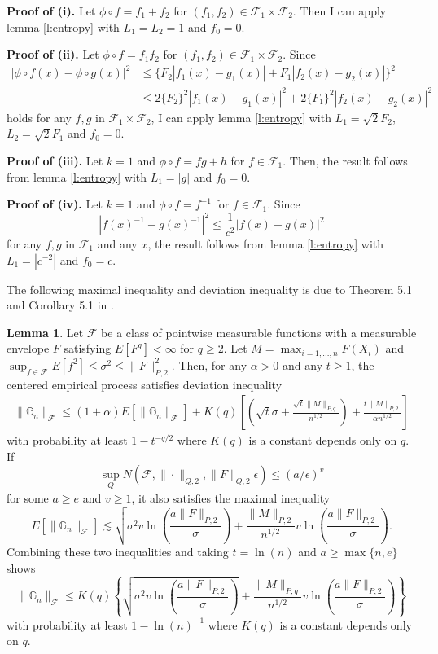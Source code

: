\documentclass[12pt,oneside,reqno,english]{amsart}
\theoremstyle{definition}
\newtheorem{lemma}{Lemma}
\begin{document}
\textbf{Proof of (i).} 
Let $\phi\circ f=f_{1}+f_{2}$ for $(f_{1},f_{2})\in \mathcal{F}_{1}\times \mathcal{F}_{2}$. 
Then I can apply lemma \ref{l:entropy} with $L_{1}=L_{2}=1$ and $f_{0}=0$. 

\textbf{Proof of (ii).} 
Let $\phi\circ f=f_{1}f_{2}$ for $(f_{1},f_{2})\in \mathcal{F}_{1}\times \mathcal{F}_{2}$. Since  
\begin{align*}
|\phi\circ f(x)-\phi\circ g(x)|^{2}&\leq \{F_{2}|f_{1}(x)-g_{1}(x)|+F_{1}|f_{2}(x)-g_{2}(x)|\}^{2}\\ 
&\leq 2\{F_{2}\}^{2}|f_{1}(x)-g_{1}(x)|^{2}+2\{F_{1}\}^{2}|f_{2}(x)-g_{2}(x)|^{2}
\end{align*}
holds for any $f, g$ in $\mathcal{F}_{1}\times \mathcal{F}_{2}$, I can apply 
lemma \ref{l:entropy} with $L_{1}=\sqrt{2}F_{2}$, $L_{2}=\sqrt{2}F_{1}$ and $f_{0}=0$. 

\textbf{Proof of (iii).} 
Let $k=1$ and $\phi\circ f= fg+h$ for $f\in \mathcal{F}_{1}$. Then, the result follows from 
lemma \ref{l:entropy} with $L_{1}=|g|$ and $f_{0}=0$.  

\textbf{Proof of (iv).} 
Let $k=1$ and $\phi\circ f= f^{-1}$ for $f\in \mathcal{F}_{1}$.
Since 
\[|f(x)^{-1}-g(x)^{-1}|^{2}\leq \frac{1}{c^{2}}|f(x)-g(x)|^{2}\]
for any $f, g$ in $\mathcal{F}_{1}$ and any $x$, 
the result follows from lemma \ref{l:entropy} with $L_{1}=|c^{-2}|$ and $f_{0}=c$.  


The following maximal inequality and deviation inequality is due to Theorem 5.1 and Corollary 5.1 in \cite{CCK:14}. 
\begin{lemma}\label{l:deviation}
Let $\mathcal{F}$ be a class of pointwise measurable functions with a measurable envelope $F$ satisfying $E[F^{q}]<\infty$ for $q\geq 2$. 
Let $M=\max_{i=1,...,n}F(X_{i})$ and $\sup_{f\in \mathcal{F}}E[f^{2}]\leq \sigma^{2}\leq \|F\|_{P,2}^{2}$. 
Then, for any $\alpha>0$ and any $t\geq 1$,
 the centered empirical process satisfies deviation inequality 
\begin{align*}
\|\mathbb{G}_{n}\|_{\mathcal{F}}\leq (1+\alpha)E[\|\mathbb{G}_{n}\|_{\mathcal{F}}]+K(q)\left[(\sqrt{t}\sigma+\frac{\sqrt{t}\|M\|_{P,q}}{n^{1/2}})+
\frac{t\|M\|_{P,2}}{\alpha n^{1/2}}\right]
\end{align*}
 with probability at least $1-t^{-q/2}$ where $K(q)$ is a constant depends only on $q$.
 If 
\[\sup_{Q}N(\mathcal{F},\|\cdot\|_{Q,2},\|F\|_{Q,2}\epsilon)\leq (a/\epsilon)^{v}\]
for some $a\geq e$ and $v\geq 1$, it also satisfies the maximal inequality
\[E[\|\mathbb{G}_{n}\|_{\mathcal{F}}]\lesssim  \sqrt{\sigma^{2} v\ln\left(\frac{ a\|F\|_{P,2}}{\sigma}\right)}+\frac{\|M\|_{P,2}}{n^{1/2}}v\ln\left(\frac{ a\|F\|_{P,2}}{\sigma}\right).\]
Combining these two inequalities and taking $t=\ln (n)$ and $a\geq \max\{n,e\}$ shows 
\[\|\mathbb{G}_{n}\|_{\mathcal{F}}\leq K(q)\left\{\sqrt{\sigma^{2} v\ln\left(\frac{ a\|F\|_{P,2}}{\sigma}\right)}+\frac{\|M\|_{P,q}}{n^{1/2}}v\ln\left(\frac{ a\|F\|_{P,2}}{\sigma}\right)\right\}\]
with probability at least $1-\ln(n)^{-1}$ where $K(q)$ is a constant depends only on $q$.
\end{lemma}
\end{document}
